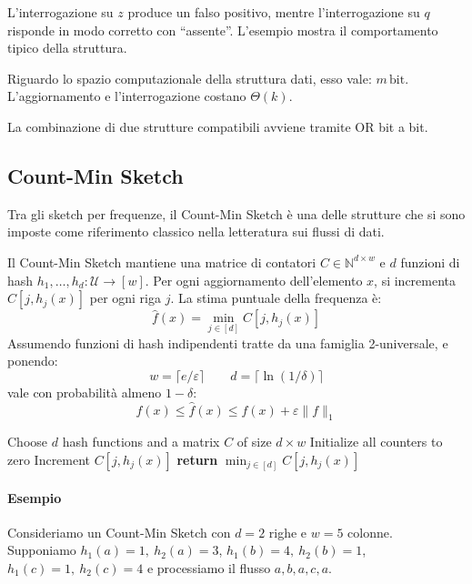 L'interrogazione su $z$ produce un falso positivo, mentre l'interrogazione su
$q$ risponde in modo corretto con ``assente''. L'esempio mostra il
comportamento tipico della struttura.

Riguardo lo spazio computazionale della struttura dati, esso vale: \(m\,\text{bit}\).
L'aggiornamento e l'interrogazione costano \(\Theta(k)\).

La combinazione di due strutture compatibili avviene tramite OR bit a bit.

\subsection{Count-Min Sketch}
Tra gli sketch per frequenze, il Count-Min Sketch è una delle strutture che si
sono imposte come riferimento classico nella letteratura sui flussi di dati.

\begin{definition}
Il Count-Min Sketch \cite{Cormode_CountMinSketch_Encyclopedia} mantiene una matrice di contatori
$C\in\mathbb{N}^{d\times w}$ e $d$ funzioni di hash
$h_1,\dots,h_d:\mathcal{U}\to[w]$. Per ogni aggiornamento
dell'elemento $x$, si incrementa $C[j,h_j(x)]$ per ogni riga $j$. La stima
puntuale della frequenza è:
\[
\hat f(x)=\min_{j\in[d]} C[j,h_j(x)]
\]
Assumendo funzioni di hash indipendenti tratte da una famiglia 2-universale, e
ponendo:
\[
w=\lceil e/\varepsilon\rceil
\qquad
d=\lceil\ln(1/\delta)\rceil
\]
vale con probabilità almeno $1-\delta$:
\[
f(x)\le \hat f(x)\le f(x)+\varepsilon\|f\|_1
\]
\end{definition}

\begin{algorithm}[htbp]
    \caption{Count-Min Sketch}
    \label{alg:cms}
    \begin{algorithmic}
        \STATE Choose $d$ hash functions and a matrix $C$ of size $d\times w$
        \STATE Initialize all counters to zero
                \STATE Increment $C[j,h_j(x)]$
            \ENDFOR
        \ENDFOR
            \STATE \textbf{return} $\min_{j\in[d]} C[j,h_j(x)]$
        \ENDFOR
    \end{algorithmic}
\end{algorithm}

\paragraph{Esempio}
Consideriamo un Count-Min Sketch con $d=2$ righe e $w=5$ colonne.
Supponiamo
$h_1(a)=1,\ h_2(a)=3$, $h_1(b)=4,\ h_2(b)=1$, $h_1(c)=1,\ h_2(c)=4$
e processiamo il flusso $a,b,a,c,a$.

